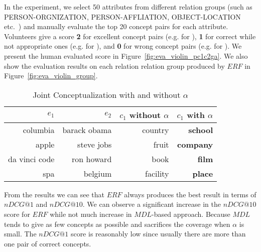 In the experiment, we select 50 attributes from different relation groups (such as \ac{PERSON-ORGNIZATION, PERSON-AFFLIATION, OBJECT-LOCATION} etc.\ ) and manually evaluate the top 20 concept pairs for each attribute.
Volunteers give a score \textbf{2} for excellent concept pairs (e.g.  for ), \textbf{1} for correct while not appropriate ones (e.g.  for  ), and \textbf{0} for wrong concept pairs (e.g.  for ).
We present the human evaluated score in Figure~\ref{fig:eva_violin_pc1c2ga}.
We also show the evaluation results on each relation relation group produced by $ERF$ in Figure~\ref{fig:eva_violin_group}.

\begin{table}[!hb]
  \vspace{-4mm}
  \centering
  \small
  \caption{Joint Conceptualization with and without $\alpha$}
    \begin{tabular}{rrrr}
    \toprule
    $e_1$                               & $e_2$                               & $c_1 $  without $\alpha$       & $c_1$  with $\alpha$ \\
    \midrule
    columbia                            & barack obama                        & country                    & \textbf{school }\\
    apple                               & steve jobs                          & fruit                & \textbf{company} \\
   da vinci code           & ron howard                       & book                     & \textbf{film} \\
    spa                                 & belgium                             & facility                  & \textbf{place} \\
    \bottomrule
    \end{tabular}%
  \label{tab:expjc}%
  \vspace{-2mm}
\end{table}%


From the results we can see that $ERF$ always produces the best result in terms of $nDCG@1$ and $nDCG@10$.
We can observe a significant increase in the $nDCG@10$ score for $ERF$ while not much increase in $MDL$-based approach. Because $MDL$ tends to give as few concepts as possible and sacrifices the coverage when $\alpha$ is small. The $nDCG@1$ score is reasonably low since usually there are more than one pair of correct concepts.

